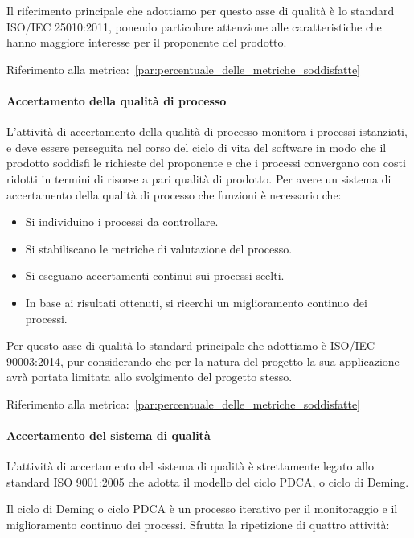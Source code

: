 \documentclass[../../norme-di-progetto.tex]{subfiles}
\begin{document}
Il riferimento principale che adottiamo per questo asse di qualità è lo standard ISO/IEC 25010:2011, ponendo particolare attenzione alle caratteristiche che hanno maggiore interesse per il proponente del prodotto.

Riferimento alla metrica\@:~\ref{par:percentuale_delle_metriche_soddisfatte}

\paragraph{Accertamento della qualità di processo}%
\label{par:accertamento_della_qualita_di_processo/attivita}

L'attività di accertamento della qualità di processo monitora i processi istanziati, e deve essere perseguita nel corso del ciclo di vita del software in modo che il prodotto soddisfi le richieste del proponente e che i processi convergano con costi ridotti in termini di risorse a pari qualità di prodotto.
Per avere un sistema di accertamento della qualità di processo che funzioni è necessario che:

\begin{itemize}
  \item Si individuino i processi da controllare.
  \item Si stabiliscano le metriche di valutazione del processo.
  \item Si eseguano accertamenti continui sui processi scelti.
  \item In base ai risultati ottenuti, si ricerchi un miglioramento continuo dei processi.
\end{itemize}

Per questo asse di qualità lo standard principale che adottiamo è ISO/IEC 90003:2014, pur considerando che per la natura del progetto la sua applicazione avrà portata limitata allo svolgimento del progetto stesso.

Riferimento alla metrica\@:~\ref{par:percentuale_delle_metriche_soddisfatte}

\paragraph{Accertamento del sistema di qualità}%
\label{par:accertamento_del_sistema_di_qualita}

L'attività di accertamento del sistema di qualità è strettamente legato allo standard ISO 9001:2005 che adotta il modello del ciclo PDCA, o ciclo di Deming.

Il ciclo di Deming o ciclo PDCA è un processo iterativo per il monitoraggio e il miglioramento continuo dei processi. Sfrutta la ripetizione di quattro attività:
\end{document}
